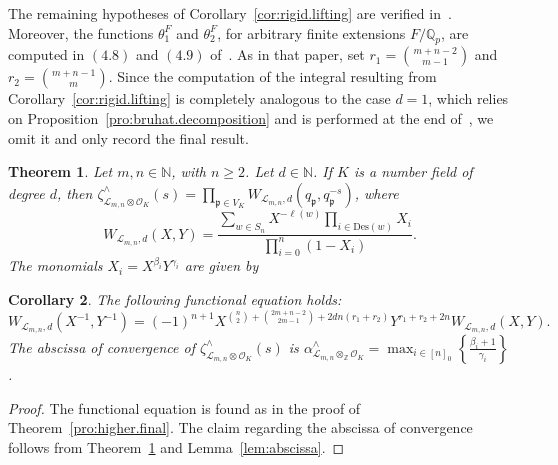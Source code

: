 \documentclass[11pt,a4paper]{amsart}
\theoremstyle{plain}
\newtheorem{thm}{Theorem}[section]
\newtheorem{cor}[thm]{Corollary}
\theoremstyle{remark}
\newcommand{\N}{\mathbb{N}}
\newcommand{\Z}{\mathbb{Z}}
\newcommand{\Q}{\mathbb{Q}}
\newcommand{\tensor}{\otimes}
\newcommand{\p}{\mathfrak{p}}
\def \p {\ensuremath{\mathfrak{p}}}
\begin{document}
The remaining hypotheses of Corollary~\ref{cor:rigid.lifting} are verified in~\cite{BKO/Dstar}.  Moreover, the functions $\theta_1^F$ and $\theta_2^F$, for arbitrary finite extensions $F/\Q_p$, are computed in $(4.8)$ and $(4.9)$ of~\cite{BKO/Dstar}.  As in that paper, set $r_1 = \binom{m+n-2}{m-1}$ and $r_2 = \binom{m+n-1}{m}$.  Since the computation of the integral resulting from Corollary~\ref{cor:rigid.lifting} is completely analogous to the case $d = 1$, which relies on Proposition~\ref{pro:bruhat.decomposition} and is performed at the end of~\cite[\S4]{BKO/Dstar}, we omit it and only record the final result.

\begin{thm} \label{thm:lmn}
Let $m,n \in \mathbb{N}$, with $n \geq 2$.  Let $d \in \N$.  If $K$ is a number field of degree $d$, then
$
\zeta^\wedge_{\mathcal{L}_{m,n} \tensor \mathcal{O}_K}(s) = \prod_{\p \in V_K} W_{\mathcal{L}_{m,n},d}(q_\p,  q_\p^{-s})$,
where 
$$ W_{\mathcal{L}_{m,n},d}(X,Y) = \frac{\sum_{w \in S_n} X^{- \ell(w)} \prod_{i \in \mathrm{Des}(w)} X_i}{\prod_{i = 0}^{n} (1 - X_i)}.$$
The monomials $X_i = X^{\beta_i}  Y^{\gamma_i}$ are given by

\end{thm}
\begin{cor} \label{cor:lmn}
The following functional equation holds:
\begin{equation*}
W_{\mathcal{L}_{m,n},d}(X^{-1}, Y^{-1}) = (-1)^{n+1} X^{\binom{n}{2} + \binom{2m + n - 2}{2m - 1} + 2dn(r_1 + r_2)}Y^{r_1 + r_2 + 2n} W_{\mathcal{L}_{m,n},d}(X,Y).
\end{equation*}
The abscissa of convergence of $\zeta^\wedge_{\mathcal{L}_{m,n} \tensor \mathcal{O}_K}(s)$ is $\alpha^\wedge_{\mathcal{L}_{m,n} \tensor_\Z \mathcal{O}_K} = \max_{i \in [n]_0} \left\{ \frac{\beta_i + 1}{\gamma_i} \right\}$.
\end{cor}
\begin{proof}
The functional equation is found as in the proof of Theorem~\ref{pro:higher.final}.  The claim regarding the abscissa of convergence follows from Theorem~\ref{thm:lmn} and Lemma~\ref{lem:abscissa}.  
\end{proof}
\end{document}
